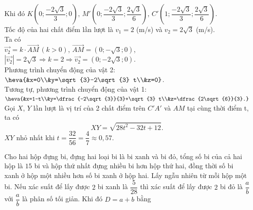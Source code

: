 \begin{ex}
{		Khi đó $K\left(0;\dfrac{-2\sqrt{3}}{3};0\right)$, $M'\left(0;\dfrac{-2\sqrt{3}}{3};\dfrac{2\sqrt{3}}{6} \right)$, $C'\left(1;\dfrac{-2\sqrt{3}}{3};\dfrac{2\sqrt{3}}{6} \right)$.\\
		Tốc độ của hai chất điểm lần lượt là $v_1=2$ (m/s) và $v_2=2\sqrt{3}$ (m/s).\\
		Ta có\\ 
		$\overrightarrow{v_2}=k\cdot \overrightarrow{AM}\,\left(k > 0\right)$, $\overrightarrow{AM}=\left(0;-\sqrt{3};0\right)$, $\left|\overrightarrow{v_2}\right|=2\sqrt{3} \Rightarrow k=2\Rightarrow \overrightarrow{v_2}=\left(0;-2\sqrt{3};0\right)$.\\
		Phương trình chuyển động của vật 2:$\heva{&x=0\\&y=\sqrt{3}-2\sqrt{3} t\\&z=0}$.\\
		Tương tự, phương trình chuyển động của vật 1: $\heva{&x=1-t\\&y=\dfrac{-2\sqrt{3}}{3}+\sqrt{3} t\\&z=\dfrac{2\sqrt{6}}{3}.}$\\
		Gọi $X$, $Y$ lần lượt là vị trí của 2 chất điểm trên $C'A'$ và $AM$ tại cùng thời điểm t, ta có
		\[XY=\sqrt{28t^2-32t+12}.\]
		$XY$ nhỏ nhất khi $t=\dfrac{32}{56}=\dfrac{4}{7} \approx 0{,}57$.
	}
\end{ex} 
\begin{ex}%
	Cho hai hộp đựng bi, đựng hai loại bi là bi xanh và bi đỏ, tổng số bi của cả hai hộp là $15$ bi và hộp thứ nhất đựng nhiều bi hơn hộp thứ hai, đồng thời số bi xanh ở hộp một nhiều hơn số bi xanh ở hộp hai. Lấy ngẫu nhiên từ mỗi hộp một bi. Nếu xác suất để lấy được $2$ bi xanh là $\dfrac{5}{28}$ thì xác suất để lấy được $2$ bi đỏ là $\dfrac{a}{b}$ với $\dfrac{a}{b}$ là phân số tối giản. Khi đó $D=a+b$ bằng
	\par{}
\end{ex}




